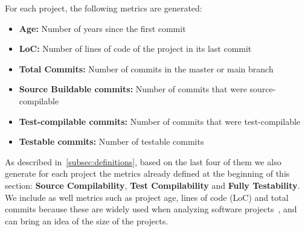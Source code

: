

For each project, the following metrics are generated:

\begin{itemize}
    \item \textbf{Age:} Number of years since the first commit
    \item \textbf{LoC:} Number of lines of code of the project in its last commit
    \item \textbf{Total Commits:} Number of commits in the master or main branch
    \item \textbf{Source Buildable commits:} Number of commits that were source-compilable
    \item \textbf{Test-compilable commits:} Number of commits that were test-compilable
    \item \textbf{Testable commits:} Number of testable commits
\end{itemize}


As described in~\ref{subsec:definitions}, based on the last four of them we also generate for each project the metrics already defined at the beginning of this section: \textbf{Source Compilability}, \textbf{Test Compilability} and \textbf{Fully Testability}.
We include as well metrics such as project age, lines of code (LoC) and total commits because these are widely used when analyzing software projects~\cite{yamashita2015revisiting,mannan2016understanding,rosen2015commit}, and can bring an idea of the size of the projects. 

